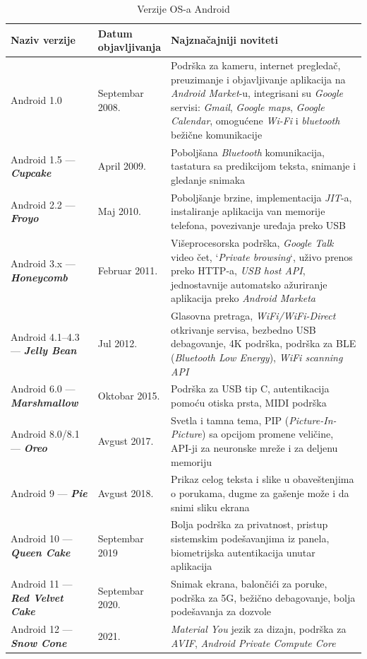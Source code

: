 \documentclass[android.tex]{subfiles}
\begin{document}
\begin{table}
\centering
\caption{Verzije OS-a Android}
\label{tbl:andrVerzije}
\begin{tabular}{p{0.25\linewidth} | p{0.15\linewidth}p{0.6\linewidth}}
\toprule
Naziv verzije & Datum objavljivanja & Najznačajniji noviteti \\
\toprule
Android 1.0 & Septembar 2008. & Podrška za kameru, internet pregledač, preuzimanje i objavljivanje aplikacija na \textit{Android Market}-u, integrisani su \textit{Google} servisi: \textit{Gmail}, \textit{Google maps}, \textit{Google Calendar}, omogućene \textit{Wi-Fi} i \textit{bluetooth} bežične komunikacije\\\midrule
Android 1.5 --- \textbf{\textit{Cupcake}} & April 2009. & Poboljšana \textit{Bluetooth} komunikacija, tastatura sa predikcijom teksta, snimanje i gledanje snimaka\\\midrule
Android 2.2 --- \textbf{\textit{Froyo}} & Maj 2010. & Poboljšanje brzine, implementacija \textit{JIT}-a, instaliranje aplikacija van memorije telefona, povezivanje uređaja preko USB \\\midrule
Android 3.x --- \textbf{\textit{Honeycomb}} & Februar 2011. & Višeprocesorska podrška, \textit{Google Talk} video čet, `\textit{Private browsing}`, uživo prenos preko HTTP-a, \textit{USB host API}, jednostavnije automatsko ažuriranje aplikacija preko \textit{Android Marketa}\\\midrule
Android 4.1--4.3 --- \textbf{\textit{Jelly Bean}} & Jul 2012. & Glasovna pretraga, \textit{WiFi/WiFi-Direct} otkrivanje servisa, bezbedno USB debagovanje, 4K podrška, podrška za BLE (\textit{Bluetooth Low Energy}), \textit{WiFi scanning API}\\\midrule
Android 6.0 --- \textbf{\textit{Marshmallow}} & Oktobar 2015. & Podrška za USB tip C, autentikacija pomoću otiska prsta, MIDI podrška\\\midrule
Android 8.0/8.1 --- \textbf{\textit{Oreo}} & Avgust 2017. & Svetla i tamna tema, PIP (\textit{Picture-In-Picture}) sa opcijom promene veličine, API-ji za neuronske mreže i za deljenu memoriju\\\midrule
Android 9 --- \textbf{\textit{Pie}} & Avgust 2018. & Prikaz celog teksta i slike u obaveštenjima o porukama, dugme za gašenje može i da snimi sliku ekrana\\\midrule
Android 10 --- \textbf{\textit{Queen Cake}} & Septembar 2019 & Bolja podrška za privatnost, pristup sistemskim podešavanjima iz panela, biometrijska autentikacija unutar aplikacija\\\midrule
Android 11 --- \textbf{\textit{Red Velvet Cake}} & Septembar 2020. & Snimak ekrana, balončići za poruke, podrška za 5G, bežično debagovanje, bolja podešavanja za dozvole\\\midrule
Android 12 --- \textbf{\textit{Snow Cone}} & 2021. & \textit{Material You }jezik za dizajn, podrška za \textit{AVIF}, \textit{Android Private Compute Core}\\
\bottomrule
\end{tabular}
\end{table}
\end{document}
